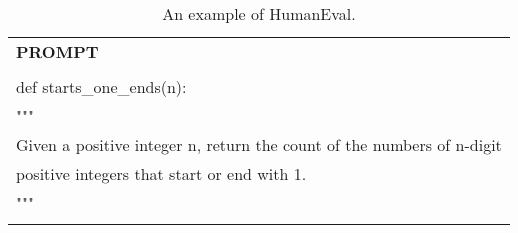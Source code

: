 \begin{table}[ht]
    \centering \small
\begin{tabular}{p{12cm}}
\toprule
\textbf{PROMPT}\\
\\def starts\_one\_ends(n):
\\    """
\\    Given a positive integer n, return the count of the numbers of n-digit
\\    positive integers that start or end with 1.
\\    """
\\\\
\bottomrule
\end{tabular}
    \caption{\centering An example of HumanEval.}
    \label{tab:humaneval_eval_format_example}
\end{table}

